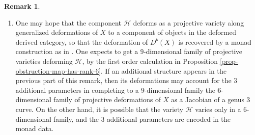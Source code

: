\documentclass[12pt]{amsart}
\numberwithin{equation}{subsection}
\theoremstyle{plain}
\theoremstyle{definition}
\newtheorem{rem}[thm]{Remark}
\renewcommand{\H}{{\mathcal H}}
\newcommand{\PP}{{\mathbb P}}
\newcommand{\Ideal}[1]{{\mathcal I}_{#1}}
\begin{document}
{\begin{rem}
\begin{enumerate}
\[\]
In particular, the Euler characteristic of $\Ideal{\tilde{C}_\xi}$ is equal to that of $\Ideal{C_1\cup C_2}$ for two disjoint translates of $C$. This suggests that the birational map from $X^{[2]}$ to ${\mathcal H}$ is regular at the point $(t,[\tilde{\xi}])$ on the diagonal divisor $X\times \PP{H^0(X,TX)}$ of $X^{[2]}$. 
If, however, $[\tilde{\xi}]$ belongs to $\varphi_{\omega_C}(C)=\varphi_{\omega_{C_t}}(C_t)$ and $[\tilde{\xi}]=\varphi_{\omega_{C_t}}(p)$, then the above composition is not surjective at $p$. The component ${\mathcal H}$ contains as limits also ideals of subschemes containing $\tilde{C}_\xi$ as well as an embedded point. 
Is the limit unique, as in the previous part of this remark, and the latter scheme structure at $p$ is determined by $\xi$, or does the scheme structure involves additional choices? 
One limit, with an embedded point at $[\tilde{\xi}]=q+t\in C_t$, is obtained as the limit of $\Ideal{C_t}\otimes \Ideal{C_{t+q-q'}}$ as we let the point $q'$ approach $q$ in $C$. This limit is well defined, by the properness of ${\mathcal H}$ and smoothness of $C$. It has  an embedded point at $q+t$, since $\Ideal{C_t}\otimes \Ideal{C_{t+q-q'}}$ is the ideal of a subscheme with an embedded point at $C_t\cap C_{t+q-q'}=\{q+t\}$.
It seems plausible that the birational morphism from $\H$ to $X^{[2]}$ is regular, and the above question asks for a description of its fibers over the $4$-dimensional subscheme $X\times \varphi_{\omega_C}(C)$ of the diagonal divisor $X\times \PP{H^0(X,TX)}$ of $X^{[2]}$. 
\item
One may hope that the component ${\mathcal H}$ deforms as a projective variety along generalized deformations of $X$ to a component of objects in the deformed derived category, so that the deformation of $D^b(X)$ is recovered by a monad construction as in \cite{markman-mehrotra}. One expects to get a $9$-dimensional family of projective varieties deforming ${\mathcal H}$, by the first order calculation in Proposition \ref{prop-obstruction-map-has-rank-6}. If an additional structure appears in the previous part of this remark, then its deformations may account for the $3$ additional parameters in completing to a $9$-dimensional family the $6$-dimensional family of projective deformations of $X$ as a Jacobian of a genus $3$ curve. On the other hand, it is possible that the variety ${\mathcal H}$ varies only in a $6$-dimensional family, and the $3$ additional parameters are encoded in the monad data.
\end{enumerate}
\end{rem}

}
\end{document}
